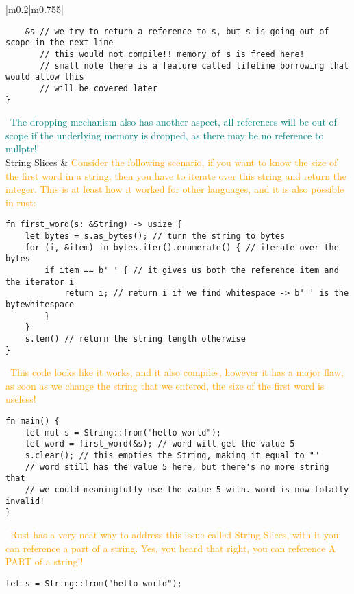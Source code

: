 \documentclass[main.tex,fontsize=8pt,paper=a4,paper=portrait,DIV=calc,]{scrartcl}
\begin{document}
\begin{table}[ht!]
\begin{tabular}{|m{0.2\linewidth}|m{0.755\linewidth}|}
\begin{lstlisting}
    &s // we try to return a reference to s, but s is going out of scope in the next line
       // this would not compile!! memory of s is freed here!
       // small note there is a feature called lifetime borrowing that would allow this
       // will be covered later
}
\end{lstlisting}
\, \newline
\textcolor{teal}{The dropping mechanism also has another aspect, all references will be out of scope if the underlying memory is dropped, as there may be no reference to nullptr!!}\\
\hline
String Slices & 
\textcolor{orange}{Consider the following scenario, if you want to know the size of the first word in a string, then you have to iterate over this string and return the integer. This is at least how it worked for other languages, and it is also possible in rust:}\newline
\begin{lstlisting}
fn first_word(s: &String) -> usize {
    let bytes = s.as_bytes(); // turn the string to bytes
    for (i, &item) in bytes.iter().enumerate() { // iterate over the bytes 
        if item == b' ' { // it gives us both the reference item and the iterator i
            return i; // return i if we find whitespace -> b' ' is the bytewhitespace
        }
    }
    s.len() // return the string length otherwise
}
\end{lstlisting}
\, \newline
\textcolor{orange}{This code looks like it works, and it also compiles, however it has a major flaw, as soon as we change the string that we entered, the size of the first word is useless! }\newline
\begin{lstlisting}
fn main() {
    let mut s = String::from("hello world");
    let word = first_word(&s); // word will get the value 5
    s.clear(); // this empties the String, making it equal to ""
    // word still has the value 5 here, but there's no more string that
    // we could meaningfully use the value 5 with. word is now totally invalid!
}
\end{lstlisting}
\, \newline
\textcolor{orange}{Rust has a very neat way to address this issue called String Slices, with it you can reference a part of a string. Yes, you heard that right, you can reference A PART of a string!!}\newline
\begin{lstlisting}
let s = String::from("hello world");


\end{lstlisting}
\end{tabular}
\end{table}
\end{document}
